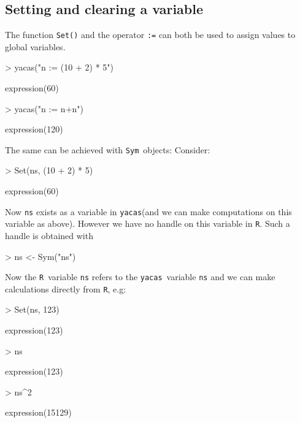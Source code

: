 \documentclass[]{article}
\newcommand{\yacas}{{\tt yacas}}
\newcommand{\code}[1]{{\tt #1}}
\def\R{\texttt{R}}
\def\sym{\texttt{Sym}}
\begin{document}
\subsection{Setting and clearing a variable}

The function \code{Set()} and the operator \code{:=} can both be used to assign
values to global variables. 
\begin{Schunk}
\begin{Sinput}
> yacas("n := (10 + 2) * 5")
\end{Sinput}
\begin{Soutput}
expression(60)
\end{Soutput}
\begin{Sinput}
> yacas("n := n+n")
\end{Sinput}
\begin{Soutput}
expression(120)
\end{Soutput}
\end{Schunk}

The same can be achieved with \sym\ objects: Consider:
\begin{Schunk}
\begin{Sinput}
> Set(ns, (10 + 2) * 5)
\end{Sinput}
\begin{Soutput}
expression(60)
\end{Soutput}
\end{Schunk}

Now \code{ns} exists as a variable in \yacas (and we
can make computations on this variable as above).
However we have no handle on
this variable in \R. Such a handle is obtained with
\begin{Schunk}
\begin{Sinput}
> ns <- Sym("ns")
\end{Sinput}
\end{Schunk}
Now the \R\ variable \code{ns} refers to the \yacas\ variable
\code{ns} and we can make  calculations directly from \R, e.g:
\begin{Schunk}
\begin{Sinput}
> Set(ns, 123)
\end{Sinput}
\begin{Soutput}
expression(123)
\end{Soutput}
\begin{Sinput}
> ns
\end{Sinput}
\begin{Soutput}
expression(123)
\end{Soutput}
\begin{Sinput}
> ns^2
\end{Sinput}
\begin{Soutput}
expression(15129)
\end{Soutput}
\end{Schunk}
\end{document}
